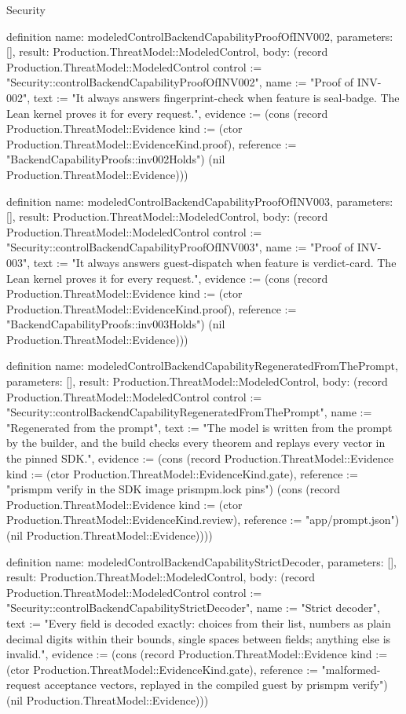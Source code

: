 \begin{lexlean}{Security}
\begin{semanticmodule}
definition{
  name: modeledControlBackendCapabilityProofOfINV002,
  parameters: [],
  result: Production.ThreatModel::ModeledControl,
  body: (record Production.ThreatModel::ModeledControl {control := "Security::controlBackendCapabilityProofOfINV002", name := "Proof of INV-002", text := "It always answers fingerprint-check when feature is seal-badge. The Lean kernel proves it for every request.", evidence := (cons (record Production.ThreatModel::Evidence {kind := (ctor Production.ThreatModel::EvidenceKind.proof), reference := "BackendCapabilityProofs::inv002Holds"}) (nil Production.ThreatModel::Evidence))})
}

definition{
  name: modeledControlBackendCapabilityProofOfINV003,
  parameters: [],
  result: Production.ThreatModel::ModeledControl,
  body: (record Production.ThreatModel::ModeledControl {control := "Security::controlBackendCapabilityProofOfINV003", name := "Proof of INV-003", text := "It always answers guest-dispatch when feature is verdict-card. The Lean kernel proves it for every request.", evidence := (cons (record Production.ThreatModel::Evidence {kind := (ctor Production.ThreatModel::EvidenceKind.proof), reference := "BackendCapabilityProofs::inv003Holds"}) (nil Production.ThreatModel::Evidence))})
}

definition{
  name: modeledControlBackendCapabilityRegeneratedFromThePrompt,
  parameters: [],
  result: Production.ThreatModel::ModeledControl,
  body: (record Production.ThreatModel::ModeledControl {control := "Security::controlBackendCapabilityRegeneratedFromThePrompt", name := "Regenerated from the prompt", text := "The model is written from the prompt by the builder, and the build checks every theorem and replays every vector in the pinned SDK.", evidence := (cons (record Production.ThreatModel::Evidence {kind := (ctor Production.ThreatModel::EvidenceKind.gate), reference := "prismpm verify in the SDK image prismpm.lock pins"}) (cons (record Production.ThreatModel::Evidence {kind := (ctor Production.ThreatModel::EvidenceKind.review), reference := "app/prompt.json"}) (nil Production.ThreatModel::Evidence)))})
}

definition{
  name: modeledControlBackendCapabilityStrictDecoder,
  parameters: [],
  result: Production.ThreatModel::ModeledControl,
  body: (record Production.ThreatModel::ModeledControl {control := "Security::controlBackendCapabilityStrictDecoder", name := "Strict decoder", text := "Every field is decoded exactly: choices from their list, numbers as plain decimal digits within their bounds, single spaces between fields; anything else is invalid.", evidence := (cons (record Production.ThreatModel::Evidence {kind := (ctor Production.ThreatModel::EvidenceKind.gate), reference := "malformed-request acceptance vectors, replayed in the compiled guest by prismpm verify"}) (nil Production.ThreatModel::Evidence))})
}


\end{semanticmodule}
\end{lexlean}
